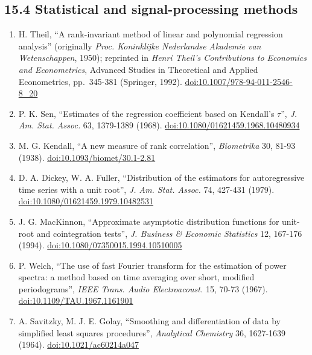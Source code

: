\documentclass[
  11pt,
  a4paper,
]{article}
\providecommand{\tightlist}{%
  \setlength{\itemsep}{0pt}\setlength{\parskip}{0pt}}
\begin{document}
\hypertarget{statistical-and-signal-processing-methods}{%
\subsection{15.4 Statistical and signal-processing
methods}\label{statistical-and-signal-processing-methods}}

\begin{enumerate}
\def\labelenumi{\arabic{enumi}.}
\setcounter{enumi}{16}
\tightlist
\item
  H. Theil, ``A rank-invariant method of linear and polynomial
  regression analysis'' (originally \emph{Proc. Koninklijke Nederlandse
  Akademie van Wetenschappen}, 1950); reprinted in \emph{Henri Theil's
  Contributions to Economics and Econometrics}, Advanced Studies in
  Theoretical and Applied Econometrics, pp.~345-381 (Springer, 1992).
  \href{https://doi.org/10.1007/978-94-011-2546-8_20}{doi:10.1007/978-94-011-2546-8\_20}
\item
  P. K. Sen, ``Estimates of the regression coefficient based on
  Kendall's $\tau$'', \emph{J. Am. Stat. Assoc.} 63, 1379-1389 (1968).
  \href{https://doi.org/10.1080/01621459.1968.10480934}{doi:10.1080/01621459.1968.10480934}
\item
  M. G. Kendall, ``A new measure of rank correlation'',
  \emph{Biometrika} 30, 81-93 (1938).
  \href{https://doi.org/10.1093/biomet/30.1-2.81}{doi:10.1093/biomet/30.1-2.81}
\item
  D. A. Dickey, W. A. Fuller, ``Distribution of the estimators for
  autoregressive time series with a unit root'', \emph{J. Am. Stat.
  Assoc.} 74, 427-431 (1979).
  \href{https://doi.org/10.1080/01621459.1979.10482531}{doi:10.1080/01621459.1979.10482531}
\item
  J. G. MacKinnon, ``Approximate asymptotic distribution functions for
  unit-root and cointegration tests'', \emph{J. Business \& Economic
  Statistics} 12, 167-176 (1994).
  \href{https://doi.org/10.1080/07350015.1994.10510005}{doi:10.1080/07350015.1994.10510005}
\item
  P. Welch, ``The use of fast Fourier transform for the estimation of
  power spectra: a method based on time averaging over short, modified
  periodograms'', \emph{IEEE Trans. Audio Electroacoust.} 15, 70-73
  (1967).
  \href{https://doi.org/10.1109/TAU.1967.1161901}{doi:10.1109/TAU.1967.1161901}
\item
  A. Savitzky, M. J. E. Golay, ``Smoothing and differentiation of data
  by simplified least squares procedures'', \emph{Analytical Chemistry}
  36, 1627-1639 (1964).
  \href{https://doi.org/10.1021/ac60214a047}{doi:10.1021/ac60214a047}
\end{enumerate}
\end{document}
